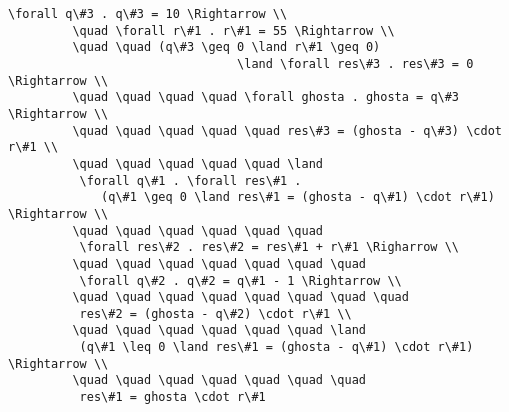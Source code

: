 \begin{lstlisting}[mathescape=true]
         \forall q\#3 . q\#3 = 10 \Rightarrow \\
         \quad \forall r\#1 . r\#1 = 55 \Rightarrow \\
         \quad \quad (q\#3 \geq 0 \land r\#1 \geq 0) 
         						\land \forall res\#3 . res\#3 = 0 \Rightarrow \\
         \quad \quad \quad \quad \forall ghosta . ghosta = q\#3 \Rightarrow \\
         \quad \quad \quad \quad \quad res\#3 = (ghosta - q\#3) \cdot r\#1 \\
         \quad \quad \quad \quad \quad \land 
          \forall q\#1 . \forall res\#1 . 
             (q\#1 \geq 0 \land res\#1 = (ghosta - q\#1) \cdot r\#1) \Rightarrow \\
         \quad \quad \quad \quad \quad \quad
          \forall res\#2 . res\#2 = res\#1 + r\#1 \Righarrow \\
         \quad \quad \quad \quad \quad \quad \quad
          \forall q\#2 . q\#2 = q\#1 - 1 \Rightarrow \\
         \quad \quad \quad \quad \quad \quad \quad \quad
          res\#2 = (ghosta - q\#2) \cdot r\#1 \\
         \quad \quad \quad \quad \quad \quad \land
          (q\#1 \leq 0 \land res\#1 = (ghosta - q\#1) \cdot r\#1) \Rightarrow \\
         \quad \quad \quad \quad \quad \quad \quad
          res\#1 = ghosta \cdot r\#1
\end{lstlisting}
